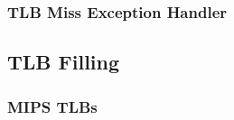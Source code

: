 \subsubsection{TLB Miss Exception Handler}






\subsection{TLB Filling}

\subsubsection{MIPS TLBs}               %


